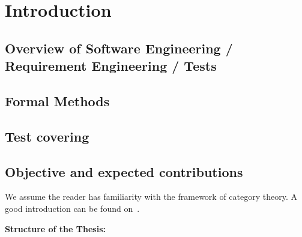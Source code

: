 \chapter{Introduction}

\section{Overview of Software Engineering / Requirement Engineering / Tests}

\section{Formal Methods}

\section{Test covering}

\section{Objective and expected contributions}

We assume the reader has familiarity with the framework of category theory. A good introduction can be found on~\cite{Pierce1991}.

\hfill \break
\textbf{Structure of the Thesis:}

